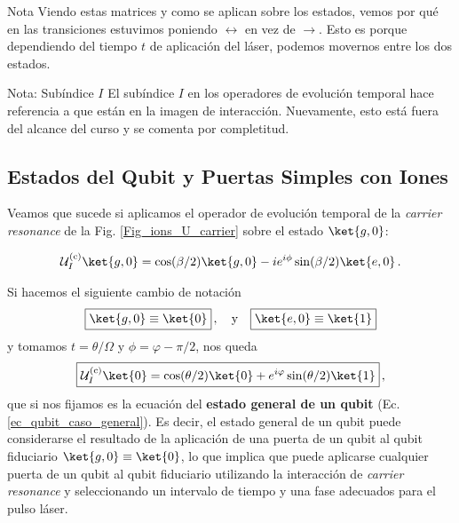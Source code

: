 \begin{mybox_blue}{Nota}
Viendo estas matrices y como se aplican sobre los estados, vemos por qué en las transiciones estuvimos poniendo $\leftrightarrow$ en vez de $\rightarrow$. Esto es porque dependiendo del tiempo $t$ de aplicación del láser, podemos movernos entre los dos estados.
\end{mybox_blue}

\begin{mybox_blue}{Nota: Subíndice $I$}
El subíndice $I$ en los operadores de evolución temporal hace referencia a que están en la imagen de interacción. Nuevamente, esto está fuera del alcance del curso y se comenta por completitud.
\end{mybox_blue}


\subsection{Estados del Qubit y Puertas Simples con Iones}

Veamos que sucede si aplicamos el operador de evolución temporal de la \textit{carrier resonance} de la Fig. \ref{Fig_ions_U_carrier} sobre el estado $\ket{g,0}$:

	\begin{equation}
	\mathcal{U}_I^{(\text{c})} \ket{g,0} = \cos(\beta/2) \ket{g,0} - i e^{i \phi} \sin (\beta/2) \ket{e,0}\, .
	\end{equation}

Si hacemos el siguiente cambio de notación
	\begin{equation}
	\boxed{\ket{g,0} \equiv \ket{0}} \,, \quad \text{y} \quad \boxed{\ket{e,0} \equiv \ket{1}}
	\end{equation}
y tomamos $t=\theta/\Omega$ y $\phi = \varphi - \pi/2$, nos queda
	\begin{equation}
	\boxed{\mathcal{U}_I^{(\text{c})} \ket{0} = \cos(\theta/2) \ket{0} + e^{i \varphi} \sin (\theta/2) \ket{1}}\, ,
	\end{equation}
que si nos fijamos es la ecuación del \textbf{estado general de un qubit} (Ec. \ref{ec_qubit_caso_general}). Es decir, el estado general de un qubit puede considerarse el resultado de la aplicación de una puerta de un qubit al qubit fiduciario $\ket{g,0} \equiv \ket{0}$, lo que implica que puede aplicarse cualquier puerta de un qubit al qubit fiduciario utilizando la interacción de \textit{carrier resonance} y seleccionando un intervalo de tiempo y una fase adecuados para el pulso láser.

